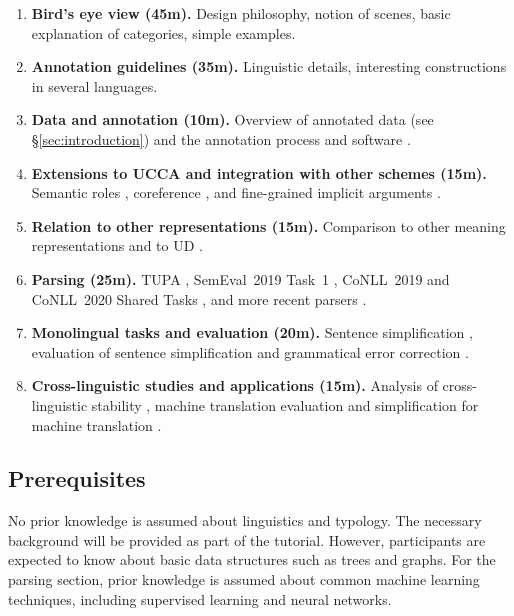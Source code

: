\documentclass[11pt,table]{article}
\begin{document}
\begin{enumerate}
    \item \textbf{Bird's eye view (45m).}
    Design philosophy, notion of scenes, basic explanation of categories, simple examples.
    \item \textbf{Annotation guidelines (35m).}
    Linguistic details, interesting constructions
    in several languages.
    \item \textbf{Data and annotation (10m).}
    Overview of annotated data (see \S\ref{sec:introduction})
    and the annotation process and software \cite{abend2017uccaapp}.
    \item \textbf{Extensions to UCCA and integration with other schemes (15m).}
    Semantic roles \cite{prange2019made},
    coreference \cite{prange2019semantically}, and
    fine-grained implicit arguments \cite{cui-hershcovich-2020-refining}.
    \item \textbf{Relation to other representations (15m).}
    Comparison to other meaning representations
    \cite{abend2017state,koller2019graph,hershcovich-et-al-2020-comparison}
    and to UD \cite{hershcovich2019content}.
    \item \textbf{Parsing (25m).}
    TUPA \cite{hershcovich2017a,hershcovich2018multitask,Her:Arv:19,Arv:Cui:Her:20},
    SemEval~2019 Task~1 \cite{hershcovich2019shared,jiang-19},
    CoNLL~2019 and CoNLL~2020 Shared Tasks \cite{Oep:Abe:Haj:19,Oep:Abe:Abz:20}, and
    more recent parsers \cite{zhang2019broad}.
    \item \textbf{Monolingual tasks and evaluation (20m).}
    Sentence simplification \cite{sulem-etal-2018-simple},
    evaluation of sentence simplification \cite{sulem-etal-2018-semantic,alvamanchego-etal:2019:easse}
    and grammatical error correction \cite{choshen-abend-2018-automatic}.
    \item \textbf{Cross-linguistic studies and applications (15m).}
    Analysis of cross-linguistic stability \cite{sulem2015conceptual},
    machine translation evaluation \cite{birch-etal-2016-hume,marecek-etal-2017-cuni,xu2020incorporate}
    and simplification for machine translation \cite{sulem-etal-2020-semantic}.
\end{enumerate}

\subsection{Prerequisites}\label{sec:prerequisites}

No prior knowledge is assumed about linguistics and typology.
The necessary background will be provided as part of the tutorial.
However, participants are expected to know about basic data structures
such as trees and graphs.
For the parsing section, prior knowledge is assumed about
common machine learning techniques, including supervised learning
and neural networks.
\end{document}
